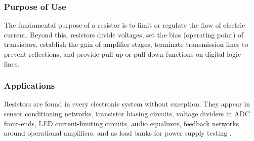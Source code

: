 \subsubsection*{Purpose of Use}
The fundamental purpose of a resistor is to limit or regulate the flow of electric
current. Beyond this, resistors divide voltages, set the bias (operating point) of
transistors, establish the gain of amplifier stages, terminate transmission lines to
prevent reflections, and provide pull-up or pull-down functions on digital logic lines.

\subsubsection*{Applications}
Resistors are found in every electronic system without exception. They appear in
sensor conditioning networks, transistor biasing circuits, voltage dividers in ADC
front-ends, LED current-limiting circuits, audio equalizers, feedback networks around
operational amplifiers, and as load banks for power supply testing \cite{boylestad2015}.
